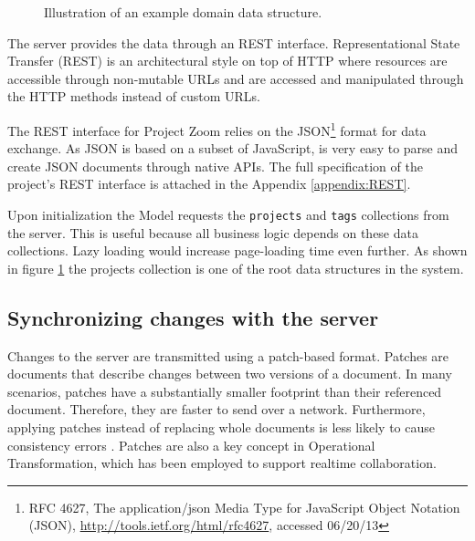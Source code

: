 \begin{figure}
\caption{Illustration of an example domain data structure.}
\label{fig:projectstruc}
\end{figure}

The server provides the data through an REST interface. Representational State Transfer (REST) is an architectural style on top of HTTP where resources are accessible through non-mutable URLs and are accessed and manipulated through the HTTP methods instead of custom URLs. \cite{Fielding_2000} 

The REST interface for Project Zoom relies on the JSON\footnote{RFC 4627,  The application/json Media Type for JavaScript Object Notation (JSON), \url{http://tools.ietf.org/html/rfc4627}, accessed 06/20/13} format for data exchange. As JSON is based on a subset of JavaScript, is very easy to parse and create JSON documents through native APIs. The full specification of the project's REST interface is attached in the Appendix \ref{appendix:REST}.

Upon initialization the Model requests the \texttt{projects} and \texttt{tags} collections from the server. This is useful because all business logic depends on these data collections. Lazy loading would increase page-loading time even further. As shown in figure \ref{fig:projectstruc} the projects collection is one of the root data structures in the system. %


\subsection{Synchronizing changes with the server}

Changes to the server are transmitted using a patch-based format. Patches are documents that describe changes between two versions of a document. In many scenarios, patches have a substantially smaller footprint than their referenced document. Therefore, they are faster to send over a network. Furthermore, applying patches instead of replacing whole documents is less likely to cause consistency errors \cite{Ellis_1989}. Patches are also a key concept in Operational Transformation, which has been employed to support realtime collaboration.

